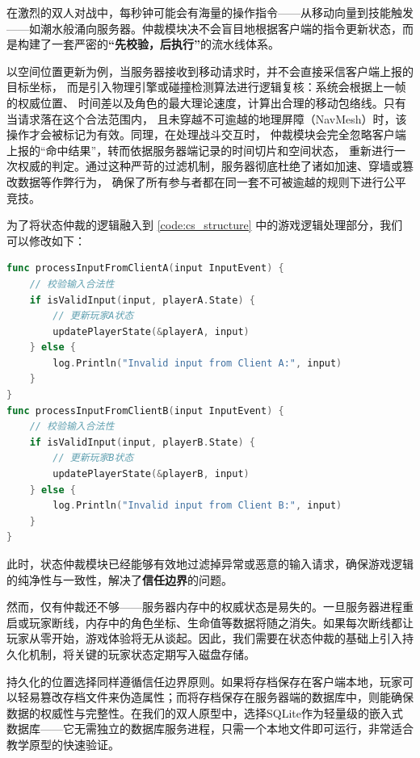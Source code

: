 在激烈的双人对战中，每秒钟可能会有海量的操作指令——从移动向量到技能触发——如潮水般涌向服务器。仲裁模块决不会盲目地根据客户端的指令更新状态，而是构建了一套严密的\textbf{“先校验，后执行”}的流水线体系。

以空间位置更新为例，当服务器接收到移动请求时，并不会直接采信客户端上报的目标坐标，
而是引入物理引擎或碰撞检测算法进行逻辑复核：系统会根据上一帧的权威位置、
时间差以及角色的最大理论速度，计算出合理的移动包络线。只有当请求落在这个合法范围内，
且未穿越不可逾越的地理屏障（NavMesh）时，该操作才会被标记为有效。同理，在处理战斗交互时，
仲裁模块会完全忽略客户端上报的“命中结果”，转而依据服务器端记录的时间切片和空间状态，
重新进行一次权威的判定。通过这种严苛的过滤机制，服务器彻底杜绝了诸如加速、穿墙或篡改数据等作弊行为，
确保了所有参与者都在同一套不可被逾越的规则下进行公平竞技。

为了将状态仲裁的逻辑融入到 \ref{code:cs_structure} 中的游戏逻辑处理部分，我们可以修改如下：
\begin{tcolorbox}[title=状态仲裁伪代码示例]
\begin{lstlisting}[style=codeblock, language=go]
func processInputFromClientA(input InputEvent) {
    // 校验输入合法性
    if isValidInput(input, playerA.State) {
        // 更新玩家A状态
        updatePlayerState(&playerA, input)
    } else {
        log.Println("Invalid input from Client A:", input)
    }
}
func processInputFromClientB(input InputEvent) {
    // 校验输入合法性
    if isValidInput(input, playerB.State) {
        // 更新玩家B状态
        updatePlayerState(&playerB, input)
    } else {
        log.Println("Invalid input from Client B:", input)
    }
}
\end{lstlisting}
\end{tcolorbox}

此时，状态仲裁模块已经能够有效地过滤掉异常或恶意的输入请求，确保游戏逻辑的纯净性与一致性，解决了\textbf{信任边界}的问题。

然而，仅有仲裁还不够——服务器内存中的权威状态是易失的。一旦服务器进程重启或玩家断线，内存中的角色坐标、生命值等数据将随之消失。如果每次断线都让玩家从零开始，游戏体验将无从谈起。因此，我们需要在状态仲裁的基础上引入持久化机制，将关键的玩家状态定期写入磁盘存储。

持久化的位置选择同样遵循信任边界原则。如果将存档保存在客户端本地，玩家可以轻易篡改存档文件来伪造属性；而将存档保存在服务器端的数据库中，则能确保数据的权威性与完整性。在我们的双人原型中，选择SQLite作为轻量级的嵌入式数据库——它无需独立的数据库服务进程，只需一个本地文件即可运行，非常适合教学原型的快速验证。

